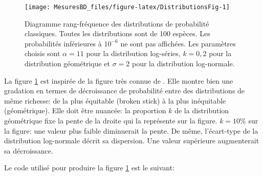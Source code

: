 \documentclass[
  11pt,
  french,
  a4paper,
  extrafontsizes,onecolumn,openright
  ]{memoir}
\begin{document}
\scriptsize

\begin{figure}

{\centering \texttt{[image: MesuresBD\_files/figure-latex/DistributionsFig-1]} 

}

\caption{Diagramme rang-fréquence des distributions de probabilité classiques. Toutes les distributions sont de 100 espèces. Les probabilités inférieures à \(10^{-6}\) ne sont pas affichées. Les paramètres choisis sont \(\alpha=11\) pour la distribution log-séries, \(k=0,2\) pour la distribution géométrique et \(\sigma=2\) pour la distribution log-normale.}\label{fig:DistributionsFig}
\end{figure}

\normalsize

La figure \ref{fig:DistributionsFig} est inspirée de la figure très connue de \textcite{Magurran1988}.
Elle montre bien une gradation en termes de décroissance de probabilité entre des distributions de même richesse: de la plus équitable (broken stick) à la plus inéquitable (géométrique).
Elle doit être nuancée: la proportion \(k\) de la distribution géométrique fixe la pente de la droite qui la représente sur la figure.
\(k=10\%\) sur la figure: une valeur plus faible diminuerait la pente.
De même, l'écart-type de la distribution log-normale décrit sa dispersion.
Une valeur supérieure augmenterait sa décroissance.

Le code utilisé pour produire la figure \ref{fig:DistributionsFig} est le suivant:

\scriptsize
\end{document}
